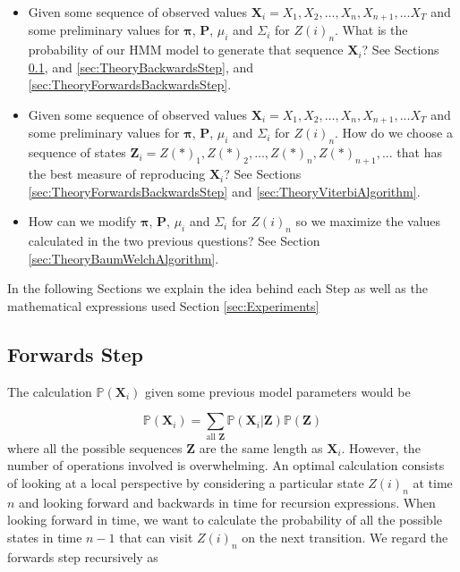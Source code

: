 \documentclass[letterpaper, 10 pt, conference]{ieeeconf}  %
\begin{document}
\begin{itemize}
\item Given some sequence of observed values $\mathbf{X}_{i} = X_{1},X_{2},\hdots,X_{n},X_{n+1},...X_{T}$ and some preliminary values for $\mathbf{\pi}$, $\mathbf{P}$, $\mu_{i}$ and $\Sigma_{i}$ for $Z(i)_{n}$.
What is the probability of our HMM model to generate that sequence $\mathbf{X}_{i}$? See Sections \ref{sec:TheoryForwardsStep}, and \ref{sec:TheoryBackwardsStep}, and  \ref{sec:TheoryForwardsBackwardsStep}.
\item Given some sequence of observed values $\mathbf{X}_{i} = X_{1},X_{2},\hdots,X_{n},X_{n+1},...X_{T}$ and some preliminary values for $\mathbf{\pi}$, $\mathbf{P}$, $\mu_{i}$ and $\Sigma_{i}$ for $Z(i)_{n}$. How do we choose a sequence of states $\mathbf{Z}_{i} = Z(\ast)_{1},Z(\ast)_{2},\hdots,Z(\ast)_{n},Z(\ast)_{n+1},...$ that has the best measure of reproducing  $\mathbf{X}_{i}$? See Sections \ref{sec:TheoryForwardsBackwardsStep} and \ref{sec:TheoryViterbiAlgorithm}.
\item How can we modify $\mathbf{\pi}$, $\mathbf{P}$, $\mu_{i}$ and $\Sigma_{i}$ for $Z(i)_{n}$ so we maximize the values calculated in the two previous questions? See Section \ref{sec:TheoryBaumWelchAlgorithm}.
\end{itemize}

In the following Sections we explain the idea behind each Step as well as the mathematical expressions used Section \ref{sec:Experiments}

\subsection{Forwards Step}
\label{sec:TheoryForwardsStep}

The  calculation $\mathbb{P}(\mathbf{X}_{i})$ given some previous model parameters would be

\begin{equation}
    \mathbb{P}(\mathbf{X}_{i}) = \sum_{\text{all } \mathbf{Z}} \mathbb{P}(\mathbf{X}_{i}|\mathbf{Z}) \mathbb{P}(\mathbf{Z})
    \label{eq:TooOperations}
\end{equation}
where all the possible sequences $\mathbf{Z}$ are the same length as $\mathbf{X}_{i}$. However, the number of operations involved is overwhelming. An optimal 
calculation consists of looking at a local perspective by considering a particular state $Z(i)_{n}$ at time $n$ and looking forward and backwards in time for recursion 
expressions. When looking forward in time, we want to calculate the probability of all the possible states in time $n-1$ that can visit $Z(i)_{n}$ on the next transition.
We regard the forwards step recursively as
 
\end{document}
